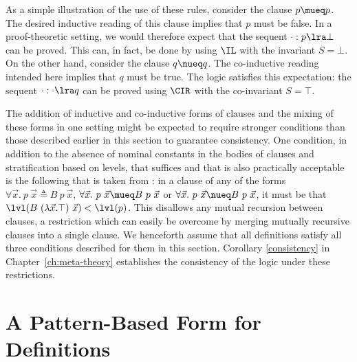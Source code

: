 As a simple illustration of the use of these rules, consider the
clause $p \mueq p$. The desired
inductive reading of this clause
implies that $p$ must be false. In a proof-theoretic setting, we would
therefore expect that the sequent $\cdot : p \lra \bot$ can be
proved. This can, in fact, be done by using $\IL$ with the invariant
$S = \bot$. On the other hand, consider the clause $q
\nueq q$. The co-inductive reading intended here implies that $q$ must
be true. The logic \logic satisfies this expectation: the
sequent $\cdot : \cdot \lra q$ can be proved using $\CIR$ with the
co-invariant $S = \top$.

The addition of inductive and co-inductive forms of clauses and the
mixing of these forms in one setting might be expected to require
stronger conditions than those described earlier in this section to
guarantee consistency. One condition, in addition to the absence of
nominal constants in the bodies of clauses and stratification based on
levels, that suffices and that is also practically acceptable is the
following that is taken from \cite{tiu.momigliano}: in a clause of any
of the forms $\forall \vec{x}.~ p\ \vec{x} \triangleq B\ p\ \vec{x}$,
$\forall \vec{x}.~ p\ \vec{x} \mueq B\ p\ \vec{x}$ or $\forall
\vec{x}.~ p\ \vec{x} \nueq B\ p\ \vec{x}$, it must be that $\lvl(B\
(\lambda\vec{x}.\top)\ \vec{x}) < \lvl(p)$. This disallows any mutual
recursion between clauses, a restriction which can easily be overcome
by merging mutually recursive clauses into a single clause. We
henceforth assume that all definitions satisfy all three conditions
described for them in this section.
Corollary \ref{consistency} in
Chapter~\ref{ch:meta-theory} establishes the consistency of the logic
under these restrictions.

\section{A Pattern-Based Form for Definitions}
\label{sec:pattern-form}

